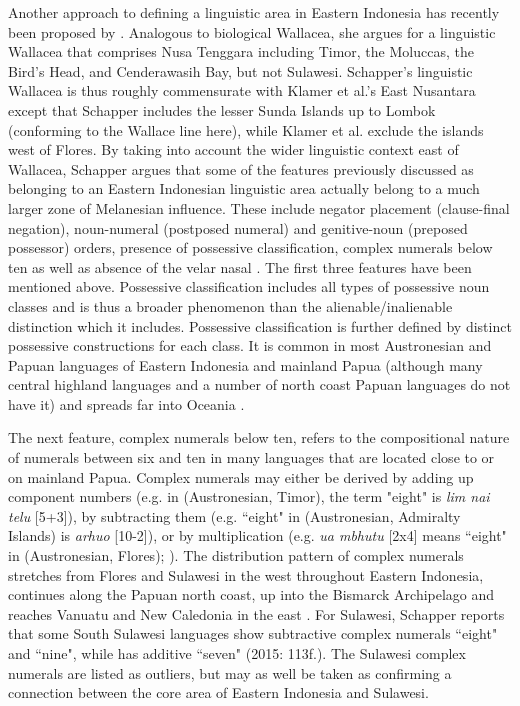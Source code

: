 Another approach to defining a linguistic area in Eastern Indonesia has recently been proposed by \citet{schapper2015wallacea}. Analogous to biological Wallacea, she argues for a linguistic Wallacea that comprises Nusa Tenggara including Timor, the Moluccas, the Bird’s Head, and Cenderawasih Bay, but not Sulawesi. Schapper's linguistic Wallacea is thus roughly commensurate with Klamer et al.'s East Nusantara except that Schapper includes the lesser Sunda Islands up to Lombok (conforming to the Wallace line here), while Klamer et al. exclude the islands west of Flores. By taking into account the wider linguistic context east of Wallacea, Schapper argues that some of the features previously discussed as belonging to an Eastern Indonesian linguistic area actually belong to a much larger zone of Melanesian influence. These include negator placement (clause-final negation), noun-numeral (postposed numeral) and genitive-noun (preposed possessor) orders, presence of possessive classification, complex numerals below ten as well as absence of the velar nasal . The first three features have been mentioned above. Possessive classification includes all types of possessive noun classes and is thus a broader phenomenon than the alienable/inalienable distinction which it includes. Possessive classification is further defined by distinct possessive constructions for each class. It is common in most Austronesian and Papuan languages of Eastern Indonesia and mainland Papua (although many central highland languages and a number of north coast Papuan languages do not have it) and spreads far into Oceania \citep[109]{schapper2015wallacea}.

The next feature, complex numerals below ten, refers to the compositional nature of numerals between six and ten in many languages that are located close to or on mainland Papua. Complex numerals may either be derived by adding up component numbers (e.g. in  (Austronesian, Timor), the term "eight" is \textit{lim nai telu} [5+3]), by subtracting them (e.g. ``eight" in  (Austronesian, Admiralty Islands) is \textit{arhuo} [10-2]), or by multiplication (e.g. \textit{ua mbhutu} [2x4] means ``eight" in  (Austronesian, Flores); \citealt[113]{schapper2015wallacea}). The distribution pattern of complex numerals stretches from Flores and Sulawesi in the west throughout Eastern Indonesia, continues along the Papuan north coast, up into the Bismarck Archipelago and reaches Vanuatu and New Caledonia in the east \citep[112--4]{schapper2015wallacea}. For Sulawesi, Schapper reports that some South Sulawesi languages show subtractive complex numerals ``eight" and ``nine", while  has additive ``seven" (2015: 113f.). The Sulawesi complex numerals are listed as outliers, but may as well be taken as confirming a connection between the core area of Eastern Indonesia and Sulawesi.

